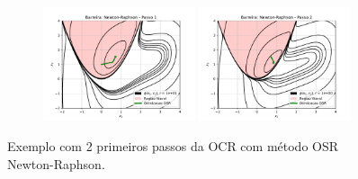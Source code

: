 \documentclass[10pt, a4paper]{article}
\begin{document}
\begin{figure}[H]
  \centering
  \begin{subfigure}[b]{\textwidth}
    \includegraphics[width=0.49\textwidth]{fig_p1/Barreira_Newton-Raphson_1.pdf}
    \includegraphics[width=0.49\textwidth]{fig_p1/Barreira_Newton-Raphson_2.pdf}
  \end{subfigure}
  \caption{Exemplo com 2 primeiros passos da OCR com método OSR Newton-Raphson. }
\end{figure}
\end{document}
